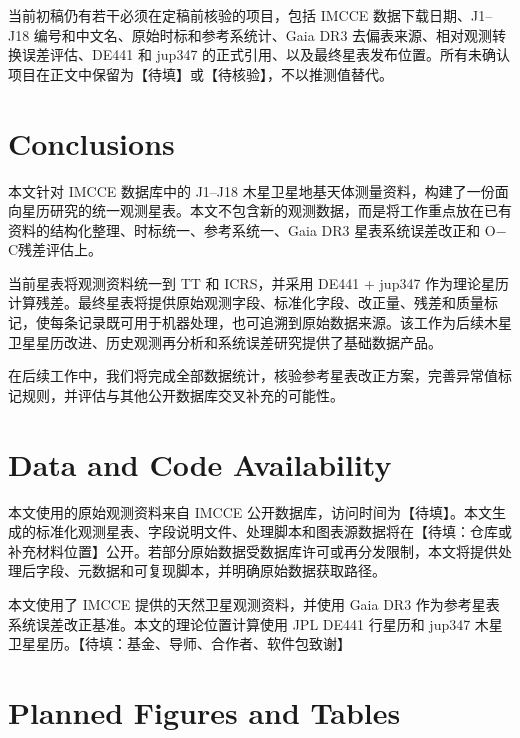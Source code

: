 \documentclass{aastex701}
\newcommand{\oc}{O$-$C}
\begin{document}
当前初稿仍有若干必须在定稿前核验的项目，包括 IMCCE 数据下载日期、J1--J18 编号和中文名、原始时标和参考系统计、Gaia DR3 去偏表来源、相对观测转换误差评估、DE441 和 jup347 的正式引用、以及最终星表发布位置。所有未确认项目在正文中保留为【待填】或【待核验】，不以推测值替代。

\section{Conclusions} \label{sec:conclusions}

本文针对 IMCCE 数据库中的 J1--J18 木星卫星地基天体测量资料，构建了一份面向星历研究的统一观测星表。本文不包含新的观测数据，而是将工作重点放在已有资料的结构化整理、时标统一、参考系统一、Gaia DR3 星表系统误差改正和 \oc 残差评估上。

当前星表将观测资料统一到 TT 和 ICRS，并采用 DE441 + jup347 作为理论星历计算残差。最终星表将提供原始观测字段、标准化字段、改正量、残差和质量标记，使每条记录既可用于机器处理，也可追溯到原始数据来源。该工作为后续木星卫星星历改进、历史观测再分析和系统误差研究提供了基础数据产品。

在后续工作中，我们将完成全部数据统计，核验参考星表改正方案，完善异常值标记规则，并评估与其他公开数据库交叉补充的可能性。

\section{Data and Code Availability} \label{sec:availability}

本文使用的原始观测资料来自 IMCCE 公开数据库，访问时间为【待填】。本文生成的标准化观测星表、字段说明文件、处理脚本和图表源数据将在【待填：仓库或补充材料位置】公开。若部分原始数据受数据库许可或再分发限制，本文将提供处理后字段、元数据和可复现脚本，并明确原始数据获取路径。

\begin{acknowledgments}
本文使用了 IMCCE 提供的天然卫星观测资料，并使用 Gaia DR3 作为参考星表系统误差改正基准。本文的理论位置计算使用 JPL DE441 行星历和 jup347 木星卫星星历。【待填：基金、导师、合作者、软件包致谢】
\end{acknowledgments}




\appendix

\section{Planned Figures and Tables} \label{app:planned}
\end{document}
